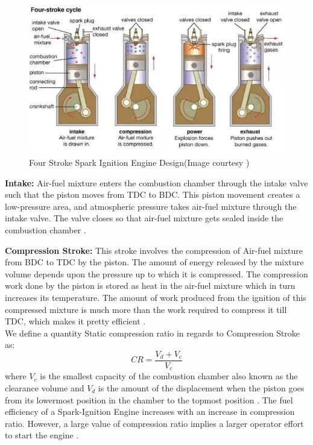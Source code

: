 \documentclass[11pt]{article}
\begin{document}
\begin{figure}[!h]
  \includegraphics[width=\linewidth,scale=0.75]{FourStroke.png}
  \caption{Four Stroke Spark Ignition Engine Design(Image courtesy \cite{fig1})}
  \label{fig:Four Stroke Spark Ignition Engine Design}
\end{figure}

\textbf{Intake:} Air-fuel mixture enters the combustion chamber through the intake valve such that the piston moves from TDC to BDC. This piston movement creates a low-pressure area, and atmospheric pressure takes air-fuel mixture through the intake valve. The valve closes so that air-fuel mixture gets sealed inside the combustion chamber \cite{ref2}.

\textbf{Compression Stroke:} This stroke involves the compression of Air-fuel mixture from BDC to TDC by the piston. The amount of energy released by the mixture volume depends upon the pressure up to which it is compressed. The compression work done by the piston is stored as heat in the air-fuel mixture which in turn increases its temperature. The amount of work produced from the ignition of this compressed mixture is much more than the work required to compress it till TDC, which makes it pretty efficient \cite{ref2}.\\
We define a quantity Static compression ratio in regards to Compression Stroke as:
\[CR=\frac{V_d+V_c}{V_c}\] where ${V_c}$ is the smallest capacity of the combustion chamber also known as the clearance volume and
$V_d$ is the amount of the displacement when the piston goes from its lowermost position in the chamber to the topmost position \cite{ref3}. The fuel efficiency of a Spark-Ignition Engine increases with an increase in compression ratio. However, a large value of compression ratio implies a larger operator effort to start the engine \cite{ref2}.
\end{document}
